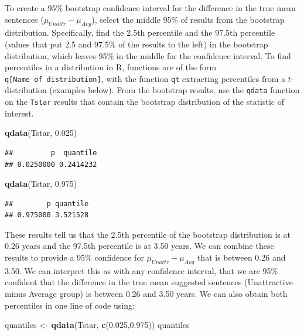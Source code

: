 \documentclass[]{book}
\newenvironment{Shaded}{\begin{snugshade}}{\end{snugshade}}
\newcommand{\KeywordTok}[1]{\textcolor[rgb]{0.13,0.29,0.53}{\textbf{#1}}}
\newcommand{\FloatTok}[1]{\textcolor[rgb]{0.00,0.00,0.81}{#1}}
\newcommand{\StringTok}[1]{\textcolor[rgb]{0.31,0.60,0.02}{#1}}
\newcommand{\NormalTok}[1]{#1}
\begin{document}
To create a 95\% bootstrap confidence interval for the difference in the
true mean sentences (\(\mu_{Unattr}-\mu_{Avg}\)), select the middle 95\%
of results from the bootstrap distribution. Specifically, find the 2.5th
percentile and the 97.5th percentile (values that put 2.5 and 97.5\% of
the results to the left) in the bootstrap distribution, which leaves
95\% in the middle for the confidence interval. To find percentiles in a
distribution in R, functions are of the form
\texttt{q{[}Name\ of\ distribution{]}}, with the function \texttt{qt}
extracting percentiles from a \(t\)-distribution (examples below). From
the bootstrap results, use the \texttt{qdata} function on the
\texttt{Tstar} results that contain the bootstrap distribution of the
statistic of interest.

\begin{Shaded}
\begin{Highlighting}[]
\KeywordTok{qdata}\NormalTok{(Tstar, }\FloatTok{0.025}\NormalTok{)}
\end{Highlighting}
\end{Shaded}

\begin{verbatim}
##         p  quantile 
## 0.0250000 0.2414232
\end{verbatim}

\begin{Shaded}
\begin{Highlighting}[]
\KeywordTok{qdata}\NormalTok{(Tstar, }\FloatTok{0.975}\NormalTok{)}
\end{Highlighting}
\end{Shaded}

\begin{verbatim}
##        p quantile 
## 0.975000 3.521528
\end{verbatim}

These results tell us that the 2.5th percentile of the bootstrap
distribution is at 0.26 years and the 97.5th percentile is at 3.50
years. We can combine these results to provide a 95\% confidence for
\(\mu_{Unattr}-\mu_{Avg}\) that is between 0.26 and 3.50. We can
interpret this as with any confidence interval, that we are 95\%
confident that the difference in the true mean suggested sentences
(Unattractive minus Average group) is between 0.26 and 3.50 years. We
can also obtain both percentiles in one line of code using:

\begin{Shaded}
\begin{Highlighting}[]
\NormalTok{quantiles <-}\StringTok{ }\KeywordTok{qdata}\NormalTok{(Tstar, }\KeywordTok{c}\NormalTok{(}\FloatTok{0.025}\NormalTok{,}\FloatTok{0.975}\NormalTok{))}
\NormalTok{quantiles}
\end{Highlighting}
\end{Shaded}
\end{document}
